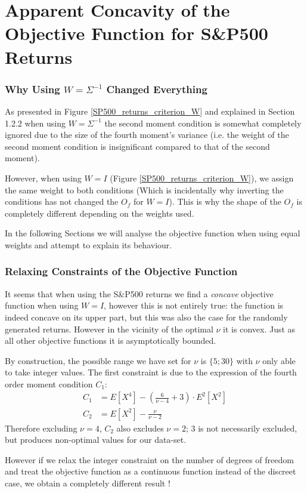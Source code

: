 \chapter{Apparent Concavity of the Objective Function for S\&P500 Returns}


\subsection{Why Using $W=\Sigma^{-1}$ Changed Everything}

As presented in Figure \ref{SP500_returns_criterion_W} and explained in Section 1.2.2 when using $W=\Sigma^{-1}$ the second moment condition is somewhat completely ignored due to the size of the fourth moment's variance (i.e. the weight of the second moment condition is insignificant compared to that of the second moment).
\smallskip\par
However, when using $W=I$ (Figure \ref{SP500_returns_criterion_W}), we assign the same weight to both conditions (Which is incidentally why inverting the conditions has not changed the $O_f$ for $W=I$). This is why the shape of the $O_f$ is completely different depending on the weights used.
\smallskip\par
In the following Sections we will analyse the objective function when using equal weights and attempt to explain its behaviour.



\subsection{Relaxing Constraints of the Objective Function}

It seems that when using the S\&P500 returns we find a \emph{concave} objective function when using $W=I$, however this is not entirely true: the function is indeed concave on its upper part, but this was also the case for the randomly generated returns. However in the vicinity of the optimal $\nu$ it is convex. Just as all other objective functions it is asymptotically bounded. \smallskip
\par
By construction, the possible range we have set for $\nu$ is $\{5;30\}$ with $\nu$ only able to take integer values. The first constraint is due to the expression of the fourth order moment condition $C_1$:
\begin{align*}
    C_1 &= E\left[X^4\right] - \left(\frac{6}{\nu-4}+3\right)\cdot E^2\left[X^2\right] \\
    C_2 &= E\left[X^2\right] - \frac{\nu}{\nu - 2}
\end{align*}
Therefore excluding $\nu = 4$, $C_2$ also excludes $\nu=2$; $3$ is not necessarily excluded, but produces non-optimal values for our data-set.
\smallskip\par
However if we relax the integer constraint on the number of degrees of freedom and treat the objective function as a continuous function instead of the discreet case, we obtain a completely different result !


